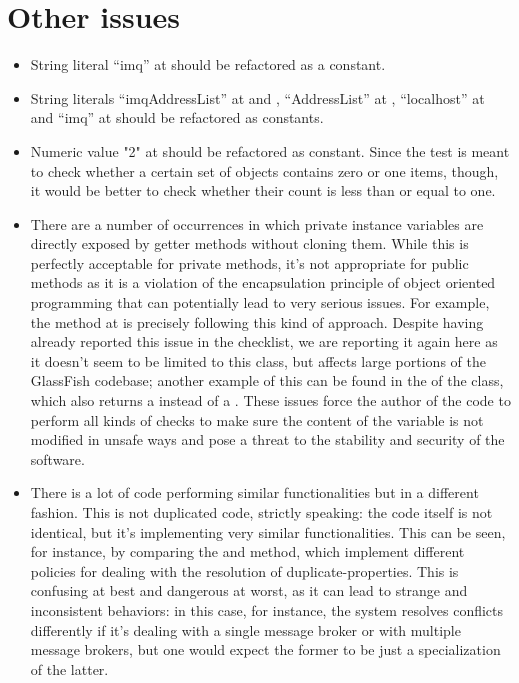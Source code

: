 \section{Other issues}
\begin{itemize}
	\item String literal “imq” at  should be refactored as a constant.	
	\item String literals “imqAddressList” at  and , “AddressList” at , “localhost” at  and “imq” at  should be refactored as constants. 
	\item Numeric value "2" at  should be refactored as constant. Since the test is meant to check whether a certain set of objects contains zero or one items, though, it would be better to check whether their count is less than or equal to one. 
	\item There are a number of occurrences in which private instance variables are directly exposed by getter methods without cloning them. While this is perfectly acceptable for private methods, it's not appropriate for public methods as it is a violation of the encapsulation principle of object oriented programming that can potentially lead to very serious issues. For example, the  method at  is precisely following this kind of approach. Despite having already reported this issue in the checklist, we are reporting it again here as it doesn't seem to be limited to this class, but affects large portions of the GlassFish codebase; another example of this can be found in the  of the  class, which also returns a  instead of a . These issues force the author of the code to perform all kinds of checks to make sure the content of the variable is not modified in unsafe ways and pose a threat to the stability and security of the software.
	\item There is a lot of code performing similar functionalities but in a different fashion. This is not duplicated code, strictly speaking: the code itself is not identical, but it's implementing very similar functionalities. This can be seen, for instance, by comparing the  and  method, which implement different policies for dealing with the resolution of duplicate-properties. This is confusing at best and dangerous at worst, as it can lead to strange and inconsistent behaviors: in this case, for instance, the system resolves conflicts differently if it's dealing with a single message broker or with multiple message brokers, but one would expect the former to be just a specialization of the latter. 

\end{itemize}
